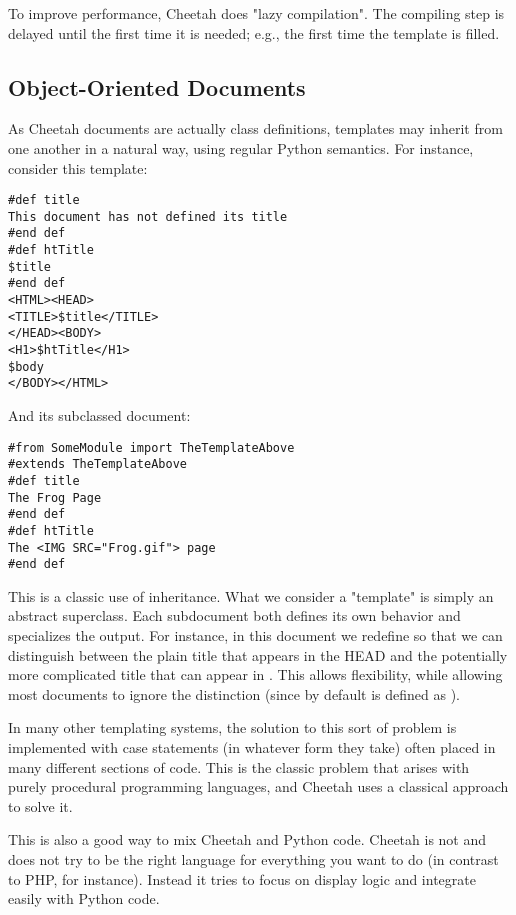 To improve performance, Cheetah does "lazy compilation".  The compiling step is
delayed until the first time it is needed; e.g., the first time the template is
filled.

\subsection{Object-Oriented Documents}
\label{howWorks.objoriented}

As Cheetah documents are actually class definitions, templates may inherit from
one another in a natural way, using regular Python semantics. For instance,
consider this template:

\begin{verbatim}
#def title
This document has not defined its title
#end def
#def htTitle
$title
#end def
<HTML><HEAD>
<TITLE>$title</TITLE>
</HEAD><BODY>
<H1>$htTitle</H1>
$body
</BODY></HTML>
\end{verbatim}

And its subclassed document:
\begin{verbatim}
#from SomeModule import TheTemplateAbove
#extends TheTemplateAbove
#def title
The Frog Page
#end def
#def htTitle
The <IMG SRC="Frog.gif"> page
#end def
\end{verbatim}

This is a classic use of inheritance. What we consider a "template" is simply an
abstract superclass. Each subdocument both defines its own behavior and
specializes the output. For instance, in this document we redefine
 so that we can distinguish between the plain title that appears
in the HEAD and the potentially more complicated title that can appear in
.  This allows flexibility, while allowing most documents to ignore the
distinction (since by default  is defined as ).

In many other templating systems, the solution to this sort of problem is
implemented with case statements (in whatever form they take) often placed in
many different sections of code. This is the classic problem that arises with
purely procedural programming languages, and Cheetah uses a classical approach
to solve it.

This is also a good way to mix Cheetah and Python code. Cheetah is not and does
not try to be the right language for everything you want to do (in contrast to
PHP, for instance). Instead it tries to focus on display logic and integrate
easily with Python code.

